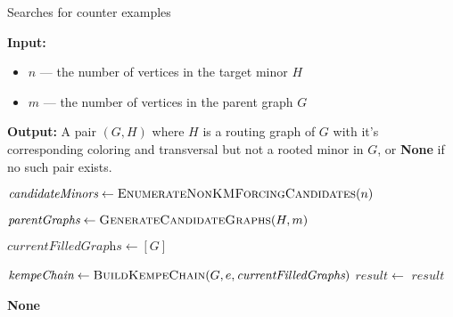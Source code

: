 \begin{algorithm}[H]
    \caption{Searches for counter examples}
    \label{alg:rooted_minor_search}
    \begin{algorithmic}[1]
            \Statex \textbf{Input:} 
            \begin{itemize}
                \item \( n \) — the number of vertices in the target minor \( H \)
                \item \( m \) — the number of vertices in the parent graph \( G \)
            \end{itemize}
            \Statex \textbf{Output:} A pair \( (G, H) \) where \( H \) is a routing graph of $G$ with it's corresponding coloring
 and transversal but not a rooted minor in \( G \), or \textbf{None} if no such pair exists.
            
            \State \( \textit{candidateMinors} \gets \Call{EnumerateNonKMForcingCandidates}{n} \)
            
                \State \( \textit{parentGraphs} \gets \Call{GenerateCandidateGraphs}{H, m} \)
                
                    \State \( \textit{currentFilledGraphs} \gets [G] \)
                    
                        \State \( \textit{kempeChain} \gets \Call{BuildKempeChain}{G, e, \textit{currentFilledGraphs}} \)
                    \EndFor
                    \State $result \gets$ 
                        \State \Return $result$ 
                    \EndIf
                \EndFor
            \EndFor
            
            \State \Return \textbf{None} 
    \end{algorithmic}
\end{algorithm}

